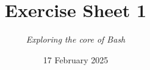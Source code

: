 




\title{{\vspace{-12mm}\huge\textbf{Exercise Sheet 1}}}
\author{\textit{Exploring the core of Bash}}
\date{{\small 17 February 2025}}


    \maketitle
    \bigskip
    
    \bigskip
    
    \bigskip
    
    \bigskip
    
    \bigskip
    
    \bigskip
    
